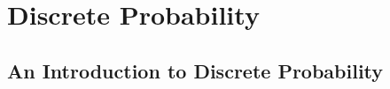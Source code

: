 \documentclass[../discrete.tex]{subfiles}
\begin{document}
\chapter{Discrete Probability}
\section{An Introduction to Discrete Probability}
\end{document}

